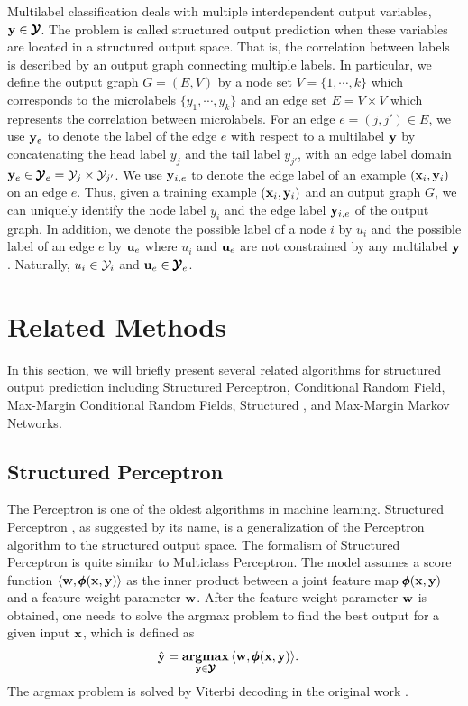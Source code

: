{Multilabel classification deals with multiple interdependent output variables, $\mathbf {y}\in\pmb {\mathcal{Y}}$.
The problem is called {structured output prediction} when these variables are located in a structured output space.
That is, the correlation between labels is described by an {output graph} connecting multiple labels.
In particular, we define the output graph $G=(E,V)$ by a node set $V=\{1,\cdots,k\}$ which corresponds to the microlabels $\{y_1,\cdots,y_k\}$ and an edge set $E=V\times V$ which represents the correlation between microlabels.
For an edge $e=(j,j')\in E$, we use $\mathbf {y}_e$ to denote the label of the edge $e$ with respect to a multilabel $\mathbf {y}$ by concatenating the head label $y_j$ and the tail label $y_{j'}$, with an edge label domain $\mathbf {y}_e\in\pmb {\mathcal{Y}}_e=\mathcal{Y}_j\times\mathcal{Y}_{j'}$.
We use $\mathbf {y}_{i,e}$ to denote the edge label of an example $(\mathbf {x}_i,\mathbf {y}_i)$ on an edge $e$.
Thus, given a training example $(\mathbf {x}_i,\mathbf {y}_i)$ and an output graph $G$, we can uniquely identify the node label $y_i$ and the edge label $\mathbf {y}_{i,e}$ of the output graph.
In addition, we denote the possible label of a node $i$ by $u_i$ and the possible label of an edge $e$ by $\mathbf {u}_{e}$ where $u_i$ and $\mathbf {u}_{e}$ are not constrained by any multilabel $\mathbf {y}$.
Naturally, $u_i\in\mathcal{Y}_i$ and $\mathbf {u}_e\in\pmb {\mathcal{Y}}_e$.



%
%
\section{Related Methods}

In this section, we will briefly present several related algorithms for structured output prediction including Structured Perceptron, Conditional Random Field, Max-Margin Conditional Random Fields, Structured \svm, and Max-Margin Markov Networks.



%
%
\subsection{Structured Perceptron}

The Perceptron \citep{Rosenblatt58} is one of the oldest algorithms in machine learning.
Structured Perceptron \citep{collins02a, collins02b}, as suggested by its name, is a generalization of the Perceptron algorithm to the structured output space.
The formalism of Structured Perceptron is quite similar to Multiclass Perceptron. 
The model assumes a score function $\langle \mathbf {w}, \pmb \phi(\mathbf {x},\mathbf {y}) \rangle$ as the inner product between a joint feature map $\pmb \phi(\mathbf {x},\mathbf {y})$ and a feature weight parameter $\mathbf {w}$.
After the feature weight parameter $\mathbf {w}$ is obtained, one needs to solve the {argmax} problem to find the best output for a given input $\mathbf {x}$, which is defined as
\begin{align}
	\hat{\mathbf {y}} = \underset{\mathbf {y}\in\pmb {\mathcal{Y}}}{\textbf{argmax}} &\, \langle \mathbf {w}, \pmb \phi(\mathbf {x},\mathbf {y}) \rangle. \label{sp_inference}
\end{align}
The argmax problem is solved by Viterbi decoding in the original work \citep{collins02a}.

}
